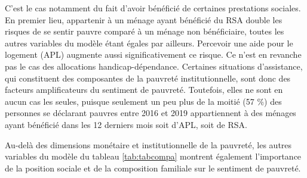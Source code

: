\documentclass[12pt,a4paper]{reedthesis}
\begin{document}
C'est le cas notamment du fait d'avoir bénéficié de certaines prestations sociales. En premier lieu, appartenir à un ménage ayant bénéficié du RSA double les risques de se sentir pauvre comparé à un ménage non bénéficiaire, toutes les autres variables du modèle étant égales par ailleurs. Percevoir une aide pour le logement (APL) augmente aussi significativement ce risque. Ce n'est en revanche pas le cas des allocations handicap-dépendance. Certaines situations d'assistance, qui constituent des composantes de la pauvreté institutionnelle, sont donc des facteurs amplificateurs du sentiment de pauvreté. Toutefois, elles ne sont en aucun cas les seules, puisque seulement un peu plus de la moitié (57 \%) des personnes se déclarant pauvres entre 2016 et 2019 appartiennent à des ménages ayant bénéficié dans les 12 derniers mois soit d'APL, soit de RSA.

Au-delà des dimensions monétaire et institutionnelle de la pauvreté, les autres variables du modèle du tableau \ref{tab:tabcompa} montrent également l'importance de la position sociale et de la composition familiale sur le sentiment de pauvreté.
\end{document}
